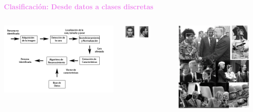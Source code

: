 \documentclass[11pt]{beamer}
\begin{document}
\begin{frame}{\textbf{\textcolor{violet}{Clasificaci\'on: Desde datos a clases discretas}} }
{ \begin{columns}
 	\begin{column}{0.4\textwidth}
 		\centering
 		\includegraphics[width=1.3\textwidth]{ML2.png}
 	\end{column}
 	\begin{column}{0.3\textwidth}
 		\centering
 		\includegraphics[width=0.6\textwidth]{ML0.png}
 	\end{column}
 	\begin{column}{0.25\textwidth}
 	\centering
 	\includegraphics[width=1.1\textwidth]{ML1.png}	

\end{column}
\end{columns}}
\end{frame}
\end{document}
